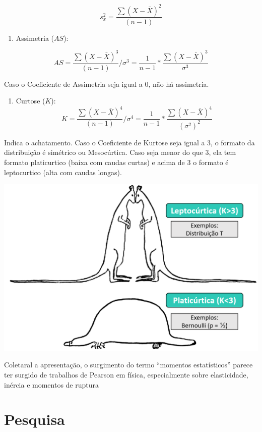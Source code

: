 \documentclass[
]{book}
\providecommand{\tightlist}{%
  \setlength{\itemsep}{0pt}\setlength{\parskip}{0pt}}
\begin{document}
\[s^{2}_{x}=\frac{\sum (X-\bar{X})^{2}}{(n-1)}\]

\begin{enumerate}
\def\labelenumi{\arabic{enumi}.}
\setcounter{enumi}{2}
\tightlist
\item
  Assimetria (\(AS\)):
\end{enumerate}

\[AS = \frac{\sum (X-\bar{X})^{3}}{(n-1)}/\sigma^3 = \frac{1}{n-1} *\frac{\sum (X-\bar{X})^3}{\sigma^3}\]

Caso o Coeficiente de Assimetria seja igual a 0, não há assimetria.

\begin{enumerate}
\def\labelenumi{\arabic{enumi}.}
\setcounter{enumi}{3}
\tightlist
\item
  Curtose (\(K\)):\\
  \[K = \frac{\sum (X-\bar{X})^{4}}{(n-1)}/\sigma^4= \frac{1}{n-1} *\frac{\sum (X-\bar{X})^4}{({\sigma^2})^2}\]
\end{enumerate}

Indica o achatamento. Caso o Coeficiente de Kurtose seja igual a 3, o formato da distribuição é simétrico ou Mesocúrtica. Caso seja menor do que 3, ela tem formato platicurtico (baixa com caudas curtas) e acima de 3 o formato é leptocurtico (alta com caudas longas).

\includegraphics{./img/cap_desc_curtose.png}

Coletaral a apresentação, o surgimento do termo ``momentos estatísticos'' parece ter surgido de trabalhos de Pearson em física, especialmente sobre elasticidade, inércia e momentos de ruptura \citep{David1998}

\hypertarget{pesquisa}{%
\section{Pesquisa}\label{pesquisa}}
\end{document}
